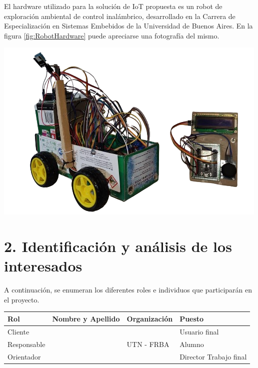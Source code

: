 \documentclass[
11pt, %
]{charter}
\begin{document}
El hardware utilizado para la solución de IoT propuesta es un robot de exploración ambiental de control inalámbrico, desarrollado en la Carrera de Especialización en Sistemas Embebidos de la Universidad de Buenos Aires. En la figura \ref{fig:RobotHardware} puede apreciarse una fotografía del mismo.

\begin{center}
 \includegraphics[scale=0.5]{Figuras/Robot_y_Joystick_1}
 \label{fig:RobotHardware}
\end{center}




\vspace{25px}



\section{2. Identificación y análisis de los interesados}
\label{sec:interesados}
A continuación, se enumeran los diferentes roles e individuos que participarán en el proyecto.
\begin{table}[ht]
\begin{tabularx}{\linewidth}{@{}|l|l|X|l|@{}}
\hline
\rowcolor[HTML]{C0C0C0}
Rol           	& Nombre y Apellido & Organización 	& Puesto 	\\ \hline
Cliente       	& \clientename      &\empclientename	&  Usuario final      	\\ \hline
Responsable   	& \authorname       & UTN - FRBA        	& Alumno 	\\ \hline
Orientador    	& \supname	      	& \pertesupname 	& Director Trabajo final \\ \hline

\end{tabularx}
\end{table}
\end{document}
